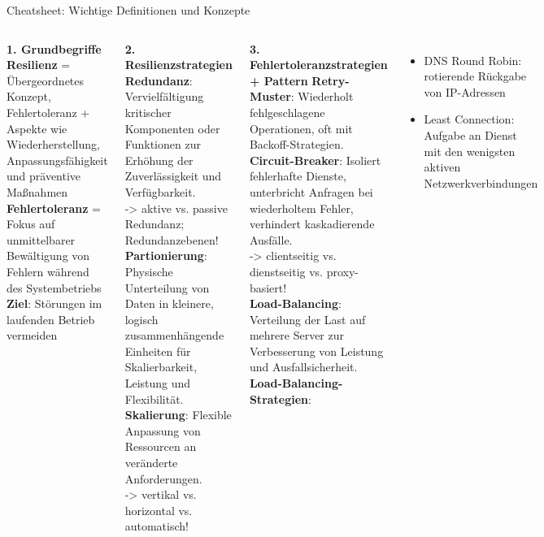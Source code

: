 \begin{frame}[shrink=10]{Cheatsheet: Wichtige Definitionen und Konzepte}
    \scriptsize
    \justifying

    \begin{columns}[t]
        \textbf{1. Grundbegriffe}\\
        \textbf{Resilienz} = Übergeordnetes Konzept, Fehlertoleranz + Aspekte wie
        Wiederherstellung, Anpassungsfähigkeit und präventive Maßnahmen\\
        \textbf{Fehlertoleranz} = Fokus auf unmittelbarer Bewältigung von Fehlern während des
        Systembetriebs\\
        \textbf{Ziel}: Störungen im laufenden Betrieb vermeiden

        \textbf{2. Resilienzstrategien}\\
            \textbf{Redundanz}: Vervielfältigung kritischer Komponenten oder Funktionen zur Erhöhung der
            Zuverlässigkeit und Verfügbarkeit.\\
        -> aktive vs. passive Redundanz; Redundanzebenen!\\
            \textbf{Partionierung}: Physische Unterteilung von Daten in kleinere, logisch zusammenhängende Einheiten
            für Skalierbarkeit, Leistung und Flexibilität.\\
            \textbf{Skalierung}: Flexible Anpassung von Ressourcen an veränderte Anforderungen.\\
        -> vertikal vs. horizontal vs. automatisch!


        \textbf{3. Fehlertoleranzstrategien + Pattern}
            \textbf{Retry-Muster}: Wiederholt fehlgeschlagene Operationen, oft mit Backoff-Strategien.\\
            \textbf{Circuit-Breaker}: Isoliert fehlerhafte Dienste, unterbricht Anfragen bei wiederholtem Fehler,
            verhindert kaskadierende Ausfälle.\\
        -> clientseitig vs. dienstseitig vs. proxy-basiert!\\
            \textbf{Load-Balancing}: Verteilung der Last auf mehrere Server zur Verbesserung von Leistung und
            Ausfallsicherheit.\\
            \textbf{Load-Balancing-Strategien}:
            \begin{itemize}
                \item DNS Round Robin: rotierende Rückgabe von IP-Adressen
                \item Least Connection: Aufgabe an Dienst mit den wenigsten aktiven Netzwerkverbindungen
            \end{itemize}
    \end{columns}
\end{frame}
